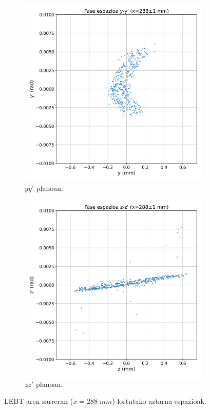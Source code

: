 \documentclass[12pt]{article}
\numberwithin{figure}{section}
\numberwithin{equation}{section}
\begin{document}
\begin{figure}[h]
    \centering
    \begin{subfigure}[b]{0.38\textwidth}
        \centering
        \includegraphics[width=\linewidth]{4 - Diseinua/lebt_emitantzia_y.png}
        \caption{$yy'$ planoan.}
        \label{fig:final_emitantzia_y}
    \end{subfigure}
    \hspace{0.02\textwidth}
    \begin{subfigure}[b]{0.38\textwidth}
        \centering
        \includegraphics[width=\linewidth]{4 - Diseinua/lebt_emitantzia_z.png}
        \caption{$zz'$ planoan.}
        \label{fig:final_emitantzia_z}
    \end{subfigure}
    \caption{LEBT-aren sarreran ($x=288\;mm$) lortutako aztarna-espazioak.}
    \label{fig:final_emittances}
\end{figure}
\end{document}
